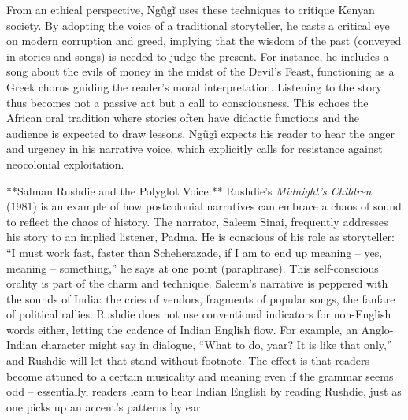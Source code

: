 \documentclass[12pt]{report}
\begin{document}
From an ethical perspective, Ngũgĩ uses these techniques to critique Kenyan society. By adopting the voice of a traditional storyteller, he casts a critical eye on modern corruption and greed, implying that the wisdom of the past (conveyed in stories and songs) is needed to judge the present. For instance, he includes a song about the evils of money in the midst of the Devil’s Feast, functioning as a Greek chorus guiding the reader’s moral interpretation. Listening to the story thus becomes not a passive act but a call to consciousness. This echoes the African oral tradition where stories often have didactic functions and the audience is expected to draw lessons. Ngũgĩ expects his reader to hear the anger and urgency in his narrative voice, which explicitly calls for resistance against neocolonial exploitation.

**Salman Rushdie and the Polyglot Voice:** Rushdie’s \textit{Midnight’s Children} (1981) is an example of how postcolonial narratives can embrace a chaos of sound to reflect the chaos of history. The narrator, Saleem Sinai, frequently addresses his story to an implied listener, Padma. He is conscious of his role as storyteller: “I must work fast, faster than Scheherazade, if I am to end up meaning – yes, meaning – something,” he says at one point (paraphrase). This self-conscious orality is part of the charm and technique. Saleem’s narrative is peppered with the sounds of India: the cries of vendors, fragments of popular songs, the fanfare of political rallies. Rushdie does not use conventional indicators for non-English words either, letting the cadence of Indian English flow. For example, an Anglo-Indian character might say in dialogue, “What to do, yaar? It is like that only,” and Rushdie will let that stand without footnote. The effect is that readers become attuned to a certain musicality and meaning even if the grammar seems odd – essentially, readers learn to hear Indian English by reading Rushdie, just as one picks up an accent’s patterns by ear. 
\end{document}

